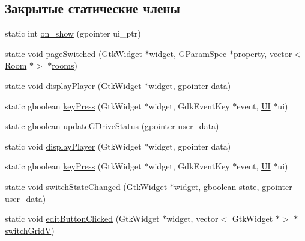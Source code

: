 \subsection*{Закрытые статические члены}
\begin{DoxyCompactItemize}
\item 
static int \hyperlink{class_u_i_a405d8c6cbfea57303917867587e7e523}{on\+\_\+show} (gpointer ui\+\_\+ptr)
\item 
static void \hyperlink{class_u_i_a4d6fc1c395de1396c3b4c17f60ce53f9}{page\+Switched} (Gtk\+Widget $\ast$widget, G\+Param\+Spec $\ast$property, vector$<$ \hyperlink{class_room}{Room} $\ast$$>$ $\ast$\hyperlink{class_u_i_ad5e9a6fd88afba6e3a647c75be137d13}{rooms})
\item 
static void \hyperlink{class_u_i_a48bcf14dfe5f38c4c531bf11f7e7217a}{display\+Player} (Gtk\+Widget $\ast$widget, gpointer data)
\item 
static gboolean \hyperlink{class_u_i_ae9d1de9359a28d1ec13f2824ec72420c}{key\+Press} (Gtk\+Widget $\ast$widget, Gdk\+Event\+Key $\ast$event, \hyperlink{class_u_i}{UI} $\ast$ui)
\item 
static gboolean \hyperlink{class_u_i_af5cf1161c6d50b6e1b1fbcfb6123e10f}{update\+G\+Drive\+Status} (gpointer user\+\_\+data)
\item 
static void \hyperlink{class_u_i_ae033d92357c8c8a175809bbee3e08b9b}{display\+Player} (Gtk\+Widget $\ast$widget, gpointer data)
\item 
static gboolean \hyperlink{class_u_i_ab9db8fde45ae6595a956feab77aaf2ca}{key\+Press} (Gtk\+Widget $\ast$widget, Gdk\+Event\+Key $\ast$event, \hyperlink{class_u_i}{UI} $\ast$ui)
\item 
static void \hyperlink{class_u_i_ad4a8a785914011267c9cba9ebe92cd23}{switch\+State\+Changed} (Gtk\+Widget $\ast$widget, gboolean state, gpointer user\+\_\+data)
\item 
static void \hyperlink{class_u_i_a2dfc8b3ab8c46094cabe6c8c332174cd}{edit\+Button\+Clicked} (Gtk\+Widget $\ast$widget, vector$<$ Gtk\+Widget $\ast$$>$ $\ast$\hyperlink{class_u_i_a6e64500f18e96ae92dc4f584f37dfc4f}{switch\+GridV})
\end{DoxyCompactItemize}
